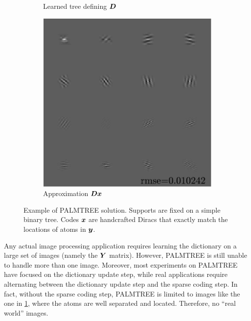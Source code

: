 \begin{figure}[!h]
\begin{subfigure}[b]{0.325\textwidth}
	\caption{Learned tree defining $\bm{D}$}
\end{subfigure}
\begin{subfigure}[b]{0.325\textwidth}\centering
\includegraphics[width=1\textwidth]{figures/tree-learn/xp_learnsupp256_curvelet_decomp3[tree-binary_dpth4]_supp-generic3x3_[fixed-supports]_approx.pdf}
	\caption{Approximation $\bm{D}\bm{x}$}
\end{subfigure}
\caption{Example of PALMTREE solution. Supports are fixed on a simple binary tree. Codes $\bm{x}$ are handcrafted Diracs that exactly match the locations of atoms in $\bm{y}$.}\label{fig_exple_fixed_tree}
\end{figure}

Any actual image processing application requires learning the dictionary on a large set of images (namely the $\bm{Y}$ matrix). However, \ac{PALMTREE} is still unable to handle more than one image. Moreover, most experiments on \ac{PALMTREE} have focused on the dictionary update step, while real applications require alternating between the dictionary update step and the sparse coding step. In fact, without the sparse coding step, \ac{PALMTREE} is limited to images like the one in \cref{fig_exple_fixed_tree}, where the atoms are well separated and located. Therefore, no “real world” images.

\FloatBarrier

